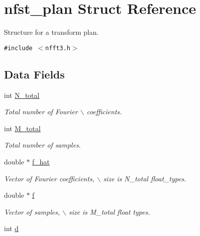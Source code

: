 \hypertarget{structnfst__plan}{
\section{nfst\_\-plan Struct Reference}
\label{structnfst__plan}
}
Structure for a transform plan.  


{\tt \#include $<$nfft3.h$>$}

\subsection*{Data Fields}
\begin{CompactItemize}
\item 
\hypertarget{structnfst__plan_o0}{
int \hyperlink{structnfst__plan_o0}{N\_\-total}}
\label{structnfst__plan_o0}

\begin{CompactList}\small\item\em Total number of Fourier $\backslash$ coefficients. \item\end{CompactList}\item 
\hypertarget{structnfst__plan_o1}{
int \hyperlink{structnfst__plan_o1}{M\_\-total}}
\label{structnfst__plan_o1}

\begin{CompactList}\small\item\em Total number of samples. \item\end{CompactList}\item 
\hypertarget{structnfst__plan_o2}{
double $\ast$ \hyperlink{structnfst__plan_o2}{f\_\-hat}}
\label{structnfst__plan_o2}

\begin{CompactList}\small\item\em Vector of Fourier coefficients, $\backslash$ size is N\_\-total float\_\-types. \item\end{CompactList}\item 
\hypertarget{structnfst__plan_o3}{
double $\ast$ \hyperlink{structnfst__plan_o3}{f}}
\label{structnfst__plan_o3}

\begin{CompactList}\small\item\em Vector of samples, $\backslash$ size is M\_\-total float types. \item\end{CompactList}\item 
\hypertarget{structnfst__plan_o4}{
int \hyperlink{structnfst__plan_o4}{d}}
\label{structnfst__plan_o4}


\end{CompactItemize}
